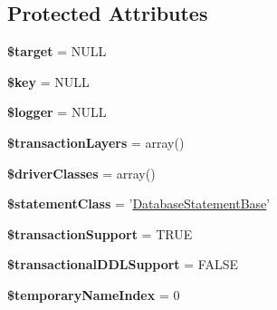 \subsection*{Protected Attributes}
\begin{DoxyCompactItemize}
\item 
\hypertarget{classDatabaseConnection_a9437bea57a47a6de0eef12b150fa253b}{
{\bfseries \$target} = NULL}
\label{classDatabaseConnection_a9437bea57a47a6de0eef12b150fa253b}

\item 
\hypertarget{classDatabaseConnection_a8e817a1024b6ecf5800dd6ad8b50a66d}{
{\bfseries \$key} = NULL}
\label{classDatabaseConnection_a8e817a1024b6ecf5800dd6ad8b50a66d}

\item 
\hypertarget{classDatabaseConnection_ad386591ee31049001e12539bca4e7fd8}{
{\bfseries \$logger} = NULL}
\label{classDatabaseConnection_ad386591ee31049001e12539bca4e7fd8}

\item 
\hypertarget{classDatabaseConnection_a7d2925e0d79e26cac1f63fdcaead83ff}{
{\bfseries \$transactionLayers} = array()}
\label{classDatabaseConnection_a7d2925e0d79e26cac1f63fdcaead83ff}

\item 
\hypertarget{classDatabaseConnection_a21303107c83b6ac9e820cc03333ae8d5}{
{\bfseries \$driverClasses} = array()}
\label{classDatabaseConnection_a21303107c83b6ac9e820cc03333ae8d5}

\item 
\hypertarget{classDatabaseConnection_a68f32d2857e06a7f07d5710de1c364b3}{
{\bfseries \$statementClass} = '\hyperlink{classDatabaseStatementBase}{DatabaseStatementBase}'}
\label{classDatabaseConnection_a68f32d2857e06a7f07d5710de1c364b3}

\item 
\hypertarget{classDatabaseConnection_a18cbb0b94d08d514c16bc676a5b15e8b}{
{\bfseries \$transactionSupport} = TRUE}
\label{classDatabaseConnection_a18cbb0b94d08d514c16bc676a5b15e8b}

\item 
\hypertarget{classDatabaseConnection_a96f82258fd4a0da57bfa1b030089c5ef}{
{\bfseries \$transactionalDDLSupport} = FALSE}
\label{classDatabaseConnection_a96f82258fd4a0da57bfa1b030089c5ef}

\item 
\hypertarget{classDatabaseConnection_ad8376cd6d63a46cf77e4f62a8780a4fb}{
{\bfseries \$temporaryNameIndex} = 0}
\label{classDatabaseConnection_ad8376cd6d63a46cf77e4f62a8780a4fb}


\end{DoxyCompactItemize}
